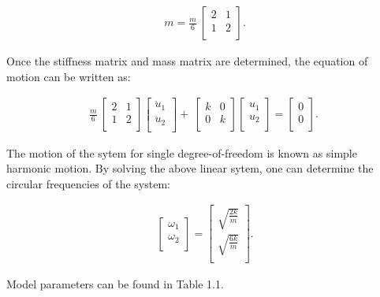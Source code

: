 \documentclass[paper=a4, fontsize=11pt]{scrartcl} %
\numberwithin{equation}{section} %
\numberwithin{figure}{section} %
\numberwithin{table}{section} %
\begin{document}
\begin{align}
  m=\frac{m}{6}\ \left[\begin{matrix}2&1\\1&2\\\end{matrix}\right].
\end{align}

Once the stiffness matrix and mass matrix are determined, the equation
of motion can be written as:

\begin{align}
\frac{m}{6}\
  \left[\begin{matrix}2&1\\1&2\\\end{matrix}\right]\left[\begin{matrix}{\ddot{u}}_1\\{\ddot{u}}_2\\\end{matrix}\right]+\
  \left[\begin{matrix}k&0\\0&k\\\end{matrix}\right]\left[\begin{matrix}u_1\\u_2\\\end{matrix}\right]=\left[\begin{matrix}0\\0\\\end{matrix}\right].\
\end{align}

The motion of the sytem for single degree-of-freedom is known as
simple harmonic motion. By solving the above linear sytem, one can
determine the circular frequencies of the system:

\begin{align}
  \begin{bmatrix}\omega_1\\\omega_2\\\end{bmatrix} =
  \begin{bmatrix} \sqrt{\frac{2k}{m}} \\ \sqrt{\frac{6k}{m}} \\ \end{bmatrix}.
\end{align}

Model parameters can be found in Table 1.1.
\end{document}
